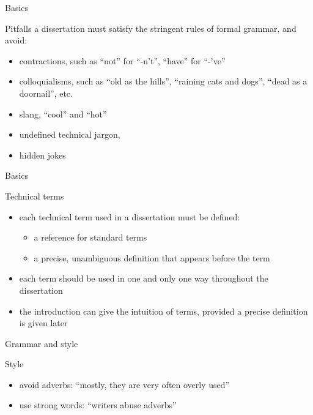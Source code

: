 \documentclass{beamer}
\begin{document}
\begin{frame}{Basics}
\begin{block}{Pitfalls}
a dissertation must satisfy the stringent rules of formal grammar, and avoid:
\begin{itemize}
\item contractions, such as ``not'' for ``-n't'', ``have'' for ``-'ve''
\item colloquialisms, such as ``old as the hills'', ``raining cats and dogs'', ``dead as a doornail'', etc.
\item slang, ``cool'' and ``hot''
\item undefined technical jargon, 
\item hidden jokes
\end{itemize}
\end{block}
\end{frame}

\begin{frame}{Basics}
\begin{block}{Technical terms}
\begin{itemize}
\item each technical term used in a dissertation must be defined:
  \begin{itemize}
  \item a reference for standard terms
  \item a precise, unambiguous definition that appears before the term 
  \end{itemize}
\item each term should be used in one and only one way throughout the dissertation
\item the introduction can give the intuition of terms, provided a precise definition is given later
\end{itemize}
\end{block}
\end{frame}

\begin{frame}{Grammar and style}
\begin{block}{Style}
\begin{itemize}
\item avoid adverbs: ``mostly, they are very often overly used''
\item use strong words: ``writers abuse adverbs''
\end{itemize}
\end{block}
\end{frame}
\end{document}
